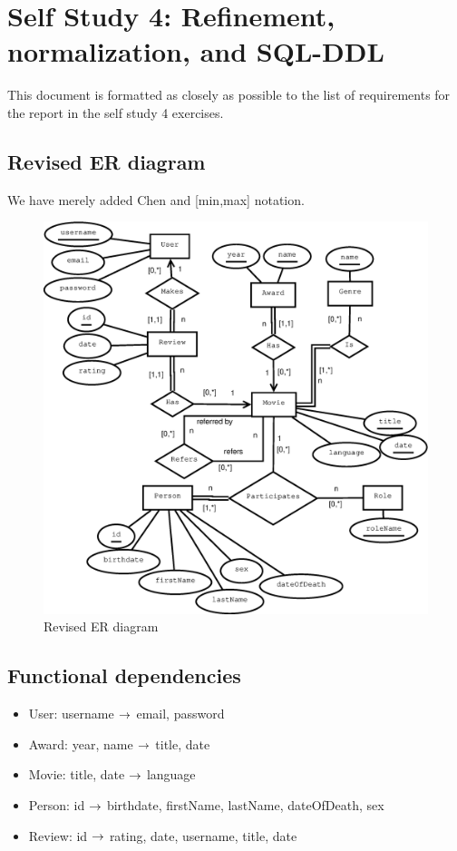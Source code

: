 \section{Self Study 4: Refinement, normalization, and SQL-DDL}
This document is formatted as closely as possible to the list of requirements for the report in the self study 4 exercises.

\subsection{Revised ER diagram}
We have merely added Chen and [min,max] notation.

\begin{figure}[h]
  \centering
  \includegraphics[width=\linewidth]{4-18.03.14/ERDiagram.eps}
  \caption{Revised ER diagram }\label{fig:ss4-er}
\end{figure}

\subsection{Functional dependencies}
\begin{itemize}
  \item User: username $\rightarrow$ email, password
  \item Award: year, name $\rightarrow$ title, date
  \item Movie: title, date $\rightarrow$ language
  \item Person: id $\rightarrow$ birthdate, firstName, lastName, dateOfDeath, sex
  \item Review: id $\rightarrow$ rating, date, username, title, date
\end{itemize}

